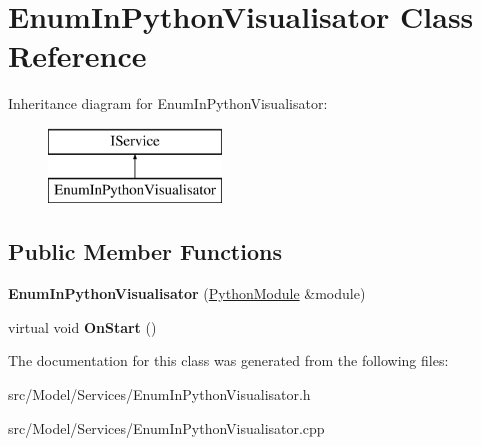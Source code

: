 \hypertarget{classEnumInPythonVisualisator}{}\section{Enum\+In\+Python\+Visualisator Class Reference}
\label{classEnumInPythonVisualisator}
Inheritance diagram for Enum\+In\+Python\+Visualisator\+:\begin{figure}[H]
\begin{center}
\leavevmode
\includegraphics[height=2.000000cm]{classEnumInPythonVisualisator}
\end{center}
\end{figure}
\subsection*{Public Member Functions}
\begin{DoxyCompactItemize}
\item 
{\bfseries Enum\+In\+Python\+Visualisator} (\hyperlink{classPythonModule}{Python\+Module} \&module)\hypertarget{classEnumInPythonVisualisator_a50c757b9491f5824a4a9dc14f27a43a3}{}\label{classEnumInPythonVisualisator_a50c757b9491f5824a4a9dc14f27a43a3}

\item 
virtual void {\bfseries On\+Start} ()\hypertarget{classEnumInPythonVisualisator_afbe8a8d56fbf6bccc821ca1e9ceeb6a5}{}\label{classEnumInPythonVisualisator_afbe8a8d56fbf6bccc821ca1e9ceeb6a5}

\end{DoxyCompactItemize}


The documentation for this class was generated from the following files\+:\begin{DoxyCompactItemize}
\item 
src/\+Model/\+Services/Enum\+In\+Python\+Visualisator.\+h\item 
src/\+Model/\+Services/Enum\+In\+Python\+Visualisator.\+cpp\end{DoxyCompactItemize}
